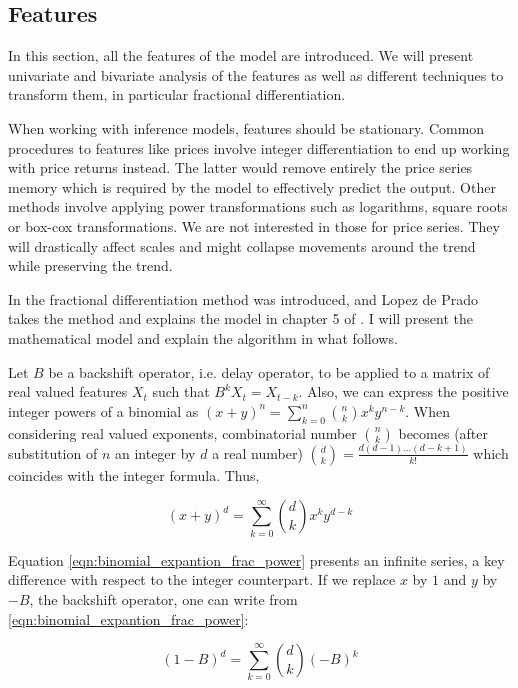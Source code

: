 \subsection{Features}
\label{sec:methods_features}


In this section, all the features of the model are introduced. We will present
univariate and bivariate analysis of the features as well as different
techniques to transform them, in particular fractional differentiation.

When working with inference models, features should be stationary. Common
procedures to features like prices involve integer differentiation to end up
working with price returns instead. The latter would remove entirely the price
series memory which is required by the model to effectively predict the output.
Other methods involve applying power transformations such as logarithms, square
roots or box-cox transformations. We are not interested in those for price series.
They will drastically affect scales and might collapse movements around the trend
while preserving the trend.

In \cite{frac_diff_paper} the fractional differentiation method was introduced,
and Lopez de Prado takes the method and explains the model in chapter 5 of
\cite{lopez_de_prado}. I will present the mathematical model and explain the
algorithm in what follows.

Let $B$ be a backshift operator, i.e. delay operator, to be applied to a matrix 
of real valued features $X_{t}$ such that $B^k X_t = X_{t-k}$. Also, we can 
express the positive integer powers of a binomial as $(x+y)^n = \sum_{k=0}^n {n \choose k} x^k y^{n-k}$.
When considering real valued exponents, combinatorial number ${n \choose k}$
becomes (after substitution of $n$ an integer by $d$ a real number) ${d \choose k} = \frac{d (d-1) ... (d-k+1)}{k!}$
which coincides with the integer formula. Thus,

\begin{equation}
  \label{eqn:binomial_expantion_frac_power}
  (x+y)^d = \sum_{k=0}^{\infty} {d \choose k} x^k y^{d-k}
\end{equation}

Equation \ref{eqn:binomial_expantion_frac_power} presents an infinite series, a
key difference with respect to the integer counterpart. If we replace $x$ by $1$
and $y$ by $-B$, the backshift operator, one can write from \ref{eqn:binomial_expantion_frac_power}:

\[(1-B)^d = \sum_{k=0}^{\infty} {d \choose k} (-B)^k \]

